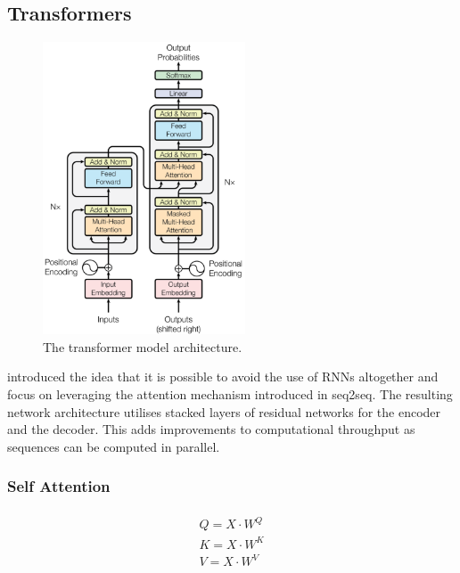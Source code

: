 \documentclass[12pt,twoside]{report}
\begin{document}
\subsection{Transformers}

\begin{figure}[!ht]
      
	\centering
	\includegraphics[width=60mm]{diagrams/transformers.png}
	\caption{The transformer model architecture.\cite{vaswani_attention_2017} \label{transformer}}
  \end{figure}

\cite{vaswani_attention_2017} introduced the idea that it is possible to avoid the use of RNNs altogether and focus on leveraging the attention mechanism introduced in seq2seq. The resulting network architecture utilises stacked layers of residual networks for the encoder and the decoder. This adds improvements to computational throughput as sequences can be computed in parallel.



\subsubsection{Self Attention}


\begin{align}
\label{eqn:eqlabel}
\begin{split}
	Q = X \cdot W^Q \\
	K = X \cdot W^K \\
	V = X \cdot W^V 
\end{split}
\end{align}
\end{document}
